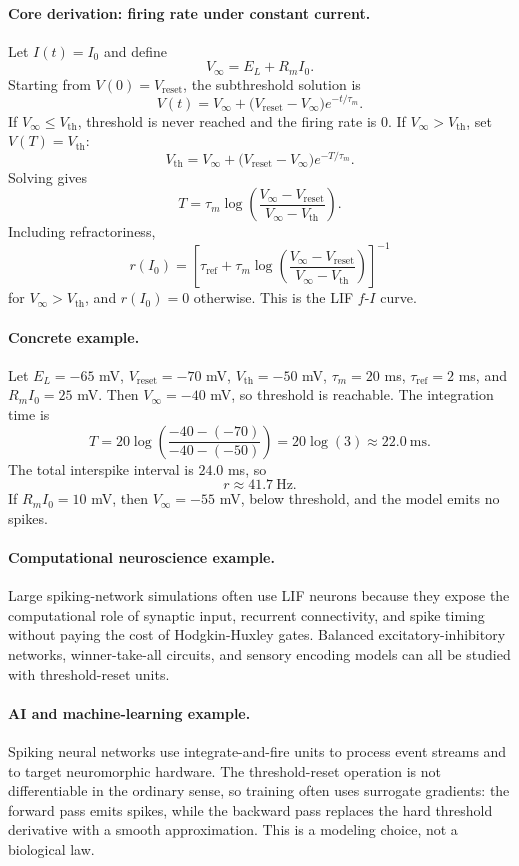 \paragraph{Core derivation: firing rate under constant current.}
Let \(I(t)=I_0\) and define
\[
V_\infty=E_L+R_m I_0.
\]
Starting from \(V(0)=V_{\mathrm{reset}}\), the subthreshold solution is
\[
V(t)=V_\infty+\bigl(V_{\mathrm{reset}}-V_\infty\bigr)e^{-t/\tau_m}.
\]
If \(V_\infty\leq V_{\mathrm{th}}\), threshold is never reached and the firing rate is \(0\). If \(V_\infty>V_{\mathrm{th}}\), set \(V(T)=V_{\mathrm{th}}\):
\[
V_{\mathrm{th}}=V_\infty+\bigl(V_{\mathrm{reset}}-V_\infty\bigr)e^{-T/\tau_m}.
\]
Solving gives
\[
T=\tau_m\log\!\left(
\frac{V_\infty-V_{\mathrm{reset}}}{V_\infty-V_{\mathrm{th}}}
\right).
\]
Including refractoriness,
\[
\boxed{
r(I_0)=
\left[
\tau_{\mathrm{ref}}
+\tau_m\log\!\left(
\frac{V_\infty-V_{\mathrm{reset}}}{V_\infty-V_{\mathrm{th}}}
\right)
\right]^{-1}
}
\]
for \(V_\infty>V_{\mathrm{th}}\), and \(r(I_0)=0\) otherwise. This is the LIF \(f\)-\(I\) curve.

\paragraph{Concrete example.}
Let \(E_L=-65\) mV, \(V_{\mathrm{reset}}=-70\) mV, \(V_{\mathrm{th}}=-50\) mV, \(\tau_m=20\) ms, \(\tau_{\mathrm{ref}}=2\) ms, and \(R_m I_0=25\) mV. Then \(V_\infty=-40\) mV, so threshold is reachable. The integration time is
\[
T=20\log\!\left(\frac{-40-(-70)}{-40-(-50)}\right)
=20\log(3)\approx 22.0\ \mathrm{ms}.
\]
The total interspike interval is \(24.0\) ms, so
\[
r\approx 41.7\ \mathrm{Hz}.
\]
If \(R_m I_0=10\) mV, then \(V_\infty=-55\) mV, below threshold, and the model emits no spikes.

\paragraph{Computational neuroscience example.}
Large spiking-network simulations often use LIF neurons because they expose the computational role of synaptic input, recurrent connectivity, and spike timing without paying the cost of Hodgkin-Huxley gates. Balanced excitatory-inhibitory networks, winner-take-all circuits, and sensory encoding models can all be studied with threshold-reset units.

\paragraph{AI and machine-learning example.}
Spiking neural networks use integrate-and-fire units to process event streams and to target neuromorphic hardware. The threshold-reset operation is not differentiable in the ordinary sense, so training often uses surrogate gradients: the forward pass emits spikes, while the backward pass replaces the hard threshold derivative with a smooth approximation. This is a modeling choice, not a biological law.

